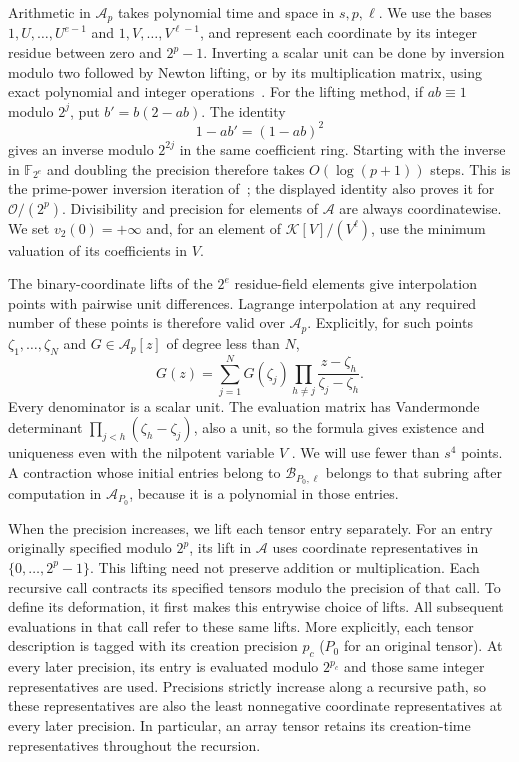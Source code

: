 Arithmetic in $\mathcal A_p$ takes polynomial time and space in
$s,p,\ell$.  We use the bases $1,U,\ldots,U^{e-1}$ and
$1,V,\ldots,V^{\ell-1}$, and represent each coordinate by its integer
residue between zero and $2^p-1$.  Inverting a scalar unit can be done
by inversion modulo two followed by Newton lifting, or by its
multiplication matrix, using exact polynomial and integer
operations~\cite{vzGG13}. For the lifting method, if $ab\equiv1$
modulo $2^j$, put $b'=b(2-ab)$. The identity
\[
 1-ab'=(1-ab)^2
\]
gives an inverse modulo $2^{2j}$ in the same coefficient ring.
Starting with the inverse in $\mathbb F_{2^e}$ and doubling the
precision therefore takes $O(\log(p+1))$ steps. This is the
prime-power inversion iteration of~\cite[Section~2.5, equation~(2.3)]{BZ10};
the displayed identity also proves it for $\mathcal O/(2^p)$.
Divisibility and precision for
elements of $\mathcal A$ are always coordinatewise.
We set $v_2(0)=+\infty$ and, for an element of $\mathcal K[V]/(V^\ell)$,
use the minimum valuation of its coefficients in $V$.

The binary-coordinate lifts of the $2^e$ residue-field elements give
interpolation points with pairwise unit differences.  Lagrange
interpolation at any required number of these points is therefore
valid over $\mathcal A_p$. Explicitly, for such points
$\zeta_1,\ldots,\zeta_N$ and $G\in\mathcal A_p[z]$ of degree less than $N$,
\[
 G(z)=\sum_{j=1}^N G(\zeta_j)
       \prod_{h\ne j}\frac{z-\zeta_h}{\zeta_j-\zeta_h}.
\]
Every denominator is a scalar unit. The evaluation matrix has
Vandermonde determinant $\prod_{j<h}(\zeta_h-\zeta_j)$, also a unit,
so the formula gives existence and uniqueness even with the
nilpotent variable $V$
\cite[Chapter~III, Exercise~1(3)--(5), p.~148]{LQ15}.
We will use fewer than $s^4$ points.
A contraction whose initial entries belong to $\mathcal B_{P_0,\ell}$
belongs to that subring after computation in $\mathcal A_{P_0}$,
because it is a polynomial in those entries.

When the precision increases, we lift each tensor entry separately.
For an entry originally specified modulo $2^p$, its lift in $\mathcal A$ uses
coordinate representatives in $\{0,\ldots,2^p-1\}$. This lifting need not preserve
addition or multiplication. Each recursive call contracts its specified
tensors modulo the precision of that call.  To define its deformation,
it first makes this entrywise choice of lifts.  All subsequent
evaluations in that call refer to these same lifts.
More explicitly, each tensor description is tagged with its creation
precision $p_c$ ($P_0$ for an original tensor).  At every later
precision, its entry is evaluated modulo $2^{p_c}$ and those same
integer representatives are used.  Precisions strictly increase
along a recursive path, so these representatives are also the
least nonnegative coordinate representatives at every later precision.  In particular,
an array tensor retains its creation-time representatives throughout the recursion.

